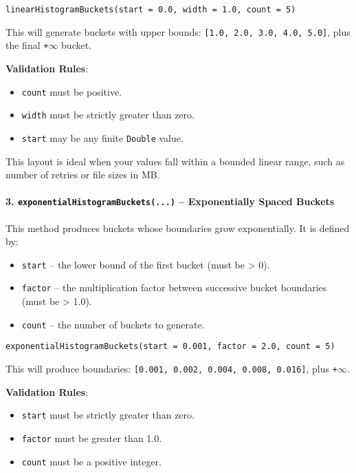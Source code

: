 \begin{verbatim}
linearHistogramBuckets(start = 0.0, width = 1.0, count = 5)
\end{verbatim}

This will generate buckets with upper bounds: \texttt{[1.0, 2.0, 3.0, 4.0, 5.0]}, plus the final \texttt{+\(\infty\)} bucket.

\textbf{Validation Rules}:
\begin{itemize}
    \item \texttt{count} must be positive.
    \item \texttt{width} must be strictly greater than zero.
    \item \texttt{start} may be any finite \texttt{Double} value.
\end{itemize}

This layout is ideal when your values fall within a bounded linear range, such as number of retries or file sizes in MB.

\paragraph{3. \texttt{exponentialHistogramBuckets(...)} – Exponentially Spaced Buckets}

This method produces buckets whose boundaries grow exponentially. It is defined by:

\begin{itemize}
    \item \texttt{start} – the lower bound of the first bucket (must be > 0).
    \item \texttt{factor} – the multiplication factor between successive bucket boundaries (must be > 1.0).
    \item \texttt{count} – the number of buckets to generate.
\end{itemize}

\begin{verbatim}
exponentialHistogramBuckets(start = 0.001, factor = 2.0, count = 5)
\end{verbatim}

This will produce boundaries:
\texttt{[0.001, 0.002, 0.004, 0.008, 0.016]}, plus \texttt{+\(\infty\)}.

\textbf{Validation Rules}:
\begin{itemize}
    \item \texttt{start} must be strictly greater than zero.
    \item \texttt{factor} must be greater than 1.0.
    \item \texttt{count} must be a positive integer.
\end{itemize}

